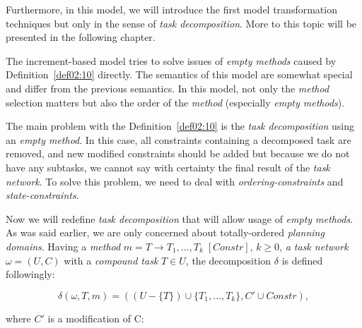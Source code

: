\medskip\noindent
Furthermore, in this model, we will introduce the first model transformation techniques but only in the sense of \emph{task decomposition}. More to this topic will be presented in the following chapter.

\medskip\noindent
The increment-based model tries to solve issues of \emph{empty methods} caused by Definition~\ref{def02:10} directly. The semantics of this model are somewhat special and differ from the previous semantics. In this model, not only the \emph{method} selection matters but also the order of the \emph{method} (especially \emph{empty methods}).

\medskip\noindent
The main problem with the Definition~\ref{def02:10} is the \emph{task decomposition} using an \emph{empty method}. In this case, all constraints containing a decomposed task are removed, and new modified constraints should be added but because we do not have any subtasks, we cannot say with certainty the final result of the \emph{task network}. To solve this problem, we need to deal with \emph{ordering-constraints} and \emph{state-constraints}. 

\medskip\noindent
Now we will redefine \emph{task decomposition} that will allow usage of \emph{empty methods}. As was said earlier, we are only concerned about totally-ordered \emph{planning domains}. Having a \emph{method} $m = T \rightarrow T_1, \dots, T_k \; [Constr]$, $k \geq 0$, \emph{a task network} $\omega = (U, C)$ with a \emph{compound task} $T \in U$, the decomposition $\delta$ is defined followingly:

\[
    \delta(\omega, T, m) = ((U - \{ T \}) \cup \{T_1, \dots, T_k\}, C' \cup Constr),
\]

\noindent
where $C'$ is a modification of C:

